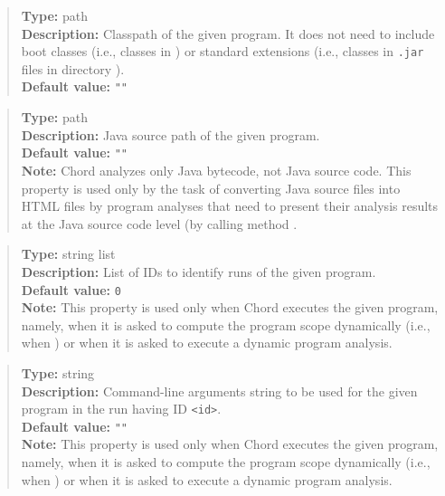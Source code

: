 \begin{quote}
{\bf Type:} path \\
{\bf Description:} Classpath of the given program.  It does not need to include
boot classes (i.e., classes in ) or
standard extensions (i.e., classes in {\tt .jar} files in directory
). \\
{\bf Default value:} {\tt ""}
\end{quote}

\begin{quote}
{\bf Type:} path \\
{\bf Description:} Java source path of the given program. \\
{\bf Default value:} {\tt ""} \\
{\bf Note:} Chord analyzes only Java bytecode, not Java source code.  This property is used only by the task of converting Java source files into HTML files by program analyses that need to present their analysis results at the Java source code level (by calling method .
\end{quote}

\begin{quote}
{\bf Type:} string list \\
{\bf Description:} List of IDs to identify runs of the given program. \\
{\bf Default value:} {\tt 0} \\
{\bf Note:} This property is used only when Chord executes the given program, namely, when it is asked to compute the program scope dynamically (i.e., when ) or when it is asked to execute a dynamic program analysis. 
\end{quote}

\begin{quote}
{\bf Type:} string \\
{\bf Description:} Command-line arguments string to be used for the given program in the run having ID {\tt <id>}. \\
{\bf Default value:} {\tt ""} \\
{\bf Note:} This property is used only when Chord executes the given program, namely, when it is asked to compute the program scope dynamically (i.e., when ) or when it is asked to execute a dynamic program analysis.
\end{quote}

